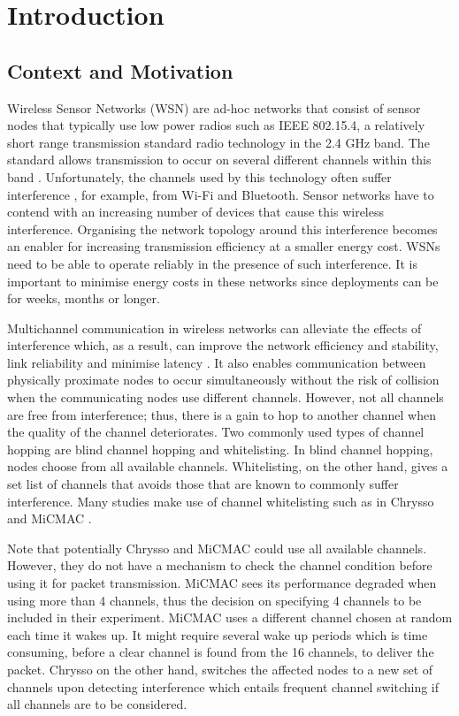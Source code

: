 \chapter{Introduction}
\label{introduction}

\section{Context and Motivation}
Wireless Sensor Networks (WSN) are ad-hoc networks that consist of sensor nodes that typically use low power radios such as IEEE 802.15.4, a relatively short range transmission standard radio technology in the 2.4 GHz band. The standard allows transmission to occur on several different channels within this band \cite{ieee802.15.4}. Unfortunately, the channels used by this technology often suffer interference \cite{Boano:2010:MSM:2127940.2127963, ieeeCompare}, for example, from Wi-Fi \cite{ieee_2012, wu} and Bluetooth. Sensor networks have to contend with an increasing number of devices that cause this wireless interference. Organising the network topology around this interference becomes an enabler for increasing transmission efficiency at a smaller energy cost. WSNs need to be able to operate reliably in the presence of such interference. It is important to minimise energy costs in these networks since deployments can be for weeks, months or longer.

Multichannel communication in wireless networks can alleviate the effects of interference which, as a result, can improve the network efficiency and stability, link reliability and minimise latency \cite{watteyne}. It also enables communication between physically proximate nodes to occur simultaneously without the risk of collision when the communicating nodes use different channels. However, not all channels are free from interference; thus, there is a gain to hop to another channel when the quality of the channel deteriorates. Two commonly used types of channel hopping \cite{watteyne} are blind channel hopping and whitelisting. In blind channel hopping, nodes choose from all available channels. 
Whitelisting, on the other hand, gives a set list of channels that avoids those that are known to commonly suffer interference.
Many studies make use of channel whitelisting such as in Chrysso \cite{chrysso} and MiCMAC \cite{micmac}.

Note that potentially Chrysso and MiCMAC could use all available channels.
However, they do not have a mechanism to check the channel condition before using it for packet transmission. MiCMAC sees its performance degraded when using more than 4 channels, thus the decision on specifying 4 channels to be included in their experiment. 
MiCMAC uses a different channel chosen at random each time it wakes up.
It might require several wake up periods which is time consuming, before a clear channel is found from the 16 channels, to deliver the packet.  
Chrysso on the other hand, switches the affected nodes to a new set of channels upon detecting interference which entails frequent channel switching if all channels are to be considered.

